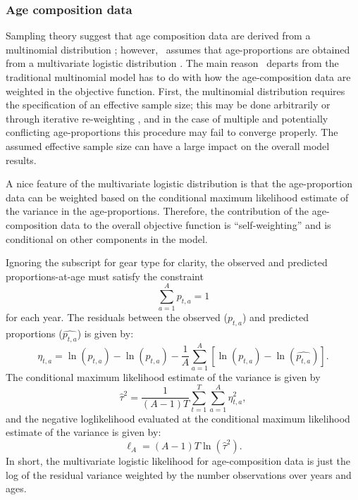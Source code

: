 \begin{multicols}{2}
\subsubsection{Age composition data}\label{agecomps}
Sampling theory suggest that age composition data are derived from a multinomial distribution \citep{fournier1982general}; however, \iscam\ assumes that age-proportions are obtained from a multivariate logistic distribution \citep{schnute1995influence,richards1997visualizing}.  The main reason \iscam\ departs from the traditional multinomial model has to do with how the age-composition data are weighted in the objective function.  First, the multinomial distribution requires the specification of an effective sample size; this may be done arbitrarily or through iterative re-weighting \citep{MCALLISTER1997,gavaris2002sif}, and in the case of multiple and potentially conflicting age-proportions this procedure may fail to converge properly.  The assumed effective sample size can have a large impact on the overall model results.  

A nice feature of the multivariate logistic distribution is that the age-proportion data can be weighted based on the conditional maximum likelihood estimate of the variance in the age-proportions.  Therefore, the contribution of the age-composition data to the overall objective function is ``self-weighting'' and is conditional on other components in the model.

Ignoring the subscript for gear type for clarity, the observed and predicted proportions-at-age must satisfy the constraint 
\[
 \sum_{a=1}^A p_{t,a} = 1
\]
for each year. The residuals between the observed ($p_{t,a}$) and predicted proportions ($\widehat{p_{t,a}}$) is given by:
\begin{equation}\label{eq7}
\eta_{t,a}=\ln(p_{t,a})-\ln(\widehat{p_{t,a}})-\frac{1}{A}\sum_{a=1}^A\left[\ln(p_{t,a})-\ln(\widehat{p_{t,a}}) \right].
\end{equation}
The conditional maximum likelihood estimate of the variance is given by
\[
\widehat{\tau}^2=\frac{1}{(A-1)T}\sum_{t=1}^T\sum_{a=1}^A \eta_{t,a}^2,
\]
and the negative loglikelihood evaluated at the conditional maximum likelihood estimate of the variance is given by:
\begin{equation}\label{eq8}
    \ell_A = (A-1)T \ln(\widehat{\tau}^2).
\end{equation}
In short, the multivariate logistic likelihood for age-composition data is just the log of the residual variance weighted by the number observations over years and ages.


\end{multicols}
